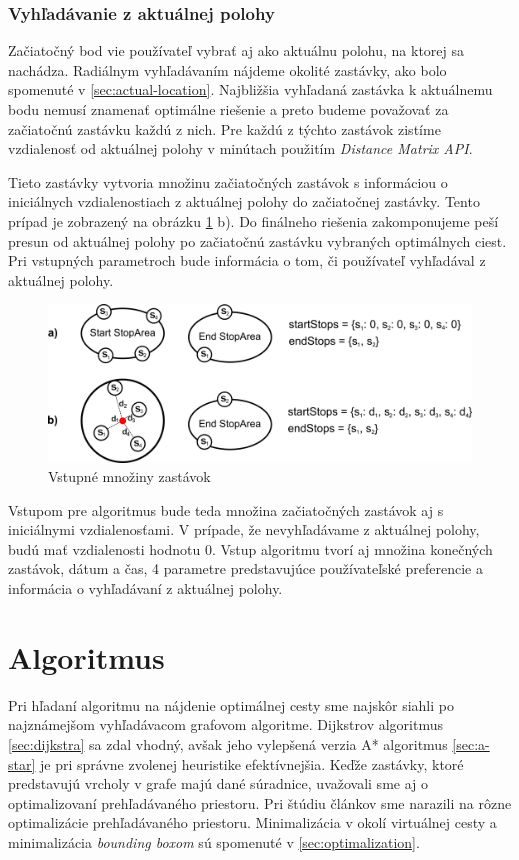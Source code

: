 \subsubsection{Vyhľadávanie z aktuálnej polohy}
Začiatočný bod vie používateľ vybrať aj ako aktuálnu polohu, na ktorej sa nachádza. Radiálnym vyhľadávaním nájdeme okolité zastávky, ako bolo spomenuté v \ref{sec:actual-location}. Najbližšia vyhľadaná zastávka k aktuálnemu bodu nemusí znamenať optimálne riešenie a preto budeme považovať za začiatočnú zastávku každú z nich. Pre každú z týchto zastávok zistíme vzdialenosť od aktuálnej polohy  v minútach použitím \textit{Distance Matrix API}. 

Tieto zastávky vytvoria množinu začiatočných zastávok s informáciou o iniciálnych vzdialenostiach z aktuálnej polohy do začiatočnej zastávky. Tento prípad je zobrazený na obrázku \ref{fig:initial-parameters} b). Do finálneho riešenia zakomponujeme peší presun od aktuálnej polohy po začiatočnú zastávku vybraných optimálnych ciest. Pri vstupných parametroch bude informácia o tom, či používateľ vyhľadával z aktuálnej polohy.

\begin{figure}[H]
\centerline{\includegraphics[width=1.0\textwidth]{images/initial-parameters}}
\caption[Vstupné množiny zasáavok]{Vstupné množiny zastávok}
\label{fig:initial-parameters}
\end{figure} 

Vstupom pre algoritmus bude teda množina začiatočných zastávok aj s iniciálnymi vzdialenosťami. V prípade, že nevyhľadávame z aktuálnej polohy, budú mať vzdialenosti hodnotu 0. Vstup algoritmu tvorí aj množina konečných zastávok, dátum a čas, 4 parametre predstavujúce používateľské preferencie a informácia o vyhľadávaní z aktuálnej polohy.

\section{Algoritmus}
Pri hľadaní algoritmu na nájdenie optimálnej cesty sme najskôr siahli po najznámejšom vyhľadávacom grafovom algoritme. Dijkstrov algoritmus \ref{sec:dijkstra} sa zdal vhodný, avšak jeho vylepšená verzia A* algoritmus \ref{sec:a-star} je pri správne zvolenej heuristike efektívnejšia. Keďže zastávky, ktoré predstavujú vrcholy v grafe majú dané súradnice, uvažovali sme aj o optimalizovaní prehľadávaného priestoru. Pri štúdiu článkov sme narazili na rôzne optimalizácie prehľadávaného priestoru. Minimalizácia v okolí virtuálnej cesty a minimalizácia \textit{bounding boxom} sú spomenuté v \ref{sec:optimalization}.

